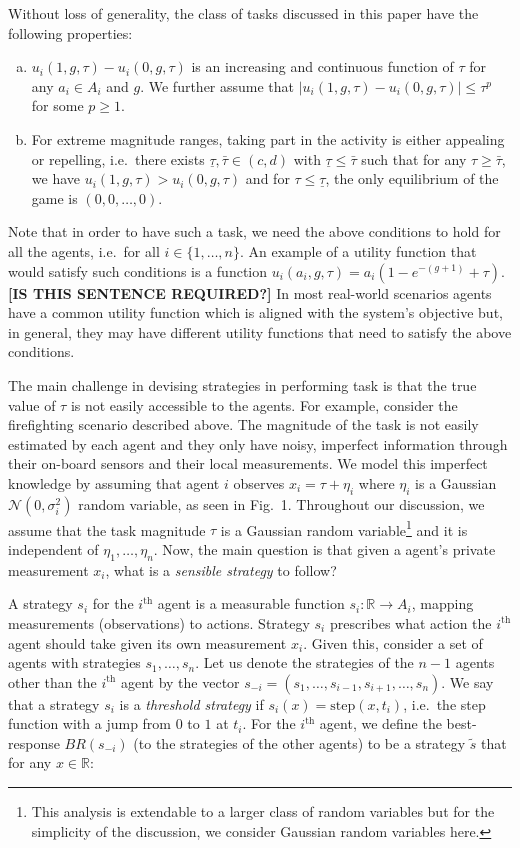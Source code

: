 \documentclass{nature}
\def\R{\mathbb{R}}    %
\begin{document}
Without loss of generality, the class of tasks discussed in this paper have the following properties:
\begin{enumerate}[a.]
	\item $u_i(1,g,\tau)-u_i(0,g,\tau)$ is an increasing and continuous function of $\tau$ for any $a_i\in A_i$ and $g$. We further assume that $|u_i(1,g,\tau)-u_i(0,g,\tau)|\leq \tau^p$ for some $p\geq 1$.
	\item For extreme magnitude ranges, taking part in the activity is either appealing or repelling, i.e.\ there exists $\underline{\tau},\bar{\tau}\in (c,d)$ with $\underline{\tau}\leq \bar{\tau}$ such that for any $\tau\geq \bar{\tau}$, we have $u_i(1,g,\tau)>u_i(0,g,\tau)$ and for $\tau\leq \underline{\tau}$, the only equilibrium of the game is $(0,0,\ldots,0)$.
\end{enumerate}

Note that in order to have such a task, we need the above conditions to hold for all the agents, i.e.\ for all $i\in\{1,\ldots,n\}$. An example of a utility function that would satisfy such conditions is a function $u_i(a_i,g,\tau)=a_i(1-e^{-(g+1)}+\tau)$. \textbf{[IS THIS SENTENCE REQUIRED?]} In most real-world scenarios agents have a common utility function which is aligned with the system's objective but, in general, they may have different utility functions that need to satisfy the above conditions. 

The main challenge in devising strategies in performing task is that the true value of $\tau$ is not easily accessible to the agents. For example, consider the firefighting scenario described above. The magnitude of the task is not easily estimated by each agent and they only have noisy, imperfect information through their on-board sensors and their local measurements.  We model this imperfect knowledge by assuming that agent $i$ observes $x_i=\tau+\eta_i$ where $\eta_i$ is a Gaussian $\mathcal{N}(0,\sigma_i^2)$ random variable, as seen in Fig.~1. Throughout our discussion, we assume that the task magnitude $\tau$ is a Gaussian random variable\footnote{This analysis is extendable to a larger class of random variables but for the simplicity of the discussion, we consider Gaussian random variables here.} and it is independent of $\eta_1,\ldots,\eta_n$. Now, the main question is that given a agent's private measurement $x_i$, what is a \emph{sensible strategy} to follow?

A strategy $s_i$ for the $i^{\text{th}}$ agent is a measurable function $s_i:\R\to A_i$, mapping measurements (observations) to actions. Strategy $s_i$ prescribes what action the $i^{\text{th}}$ agent should take given its own measurement $x_i$. Given this, consider a set of agents with strategies $s_1,\ldots,s_n$. Let us denote the strategies of the $n-1$ agents other than the $i^{\text{th}}$ agent by the vector $s_{-i}=(s_1,\ldots,s_{i-1},s_{i+1},\ldots,s_n)$.  We say that a strategy $s_i$ is a \emph{threshold strategy} if $s_i(x)=\text{step}(x, t_i)$, i.e.\ the step function with a jump from $0$ to $1$ at $t_i$. For the $i^{\text{th}}$ agent, we define the best-response $BR(s_{-i})$ (to the strategies of the other agents) to be a strategy $\tilde{s}$ that for any $x\in \R$:
\end{document}
